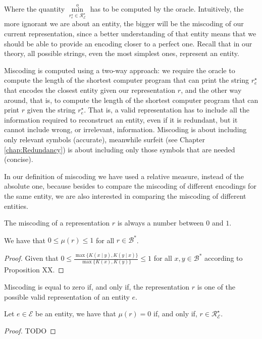 Where the quantity $\overset{o}{ \underset{ r^\star_e \in \mathcal{R}^\star_\mathcal{E} } \min}$ has to be computed by the oracle. Intuitively, the more ignorant we are about an entity, the bigger will be the miscoding of our current representation, since a better understanding of that entity means that we should be able to provide an encoding closer to a perfect one. Recall that in our theory, all possible strings, even the most simplest ones, represent an entity.

Miscoding is computed using a two-way approach: we require the oracle to compute the length of the shortest computer program that can print the string $r^\star_e$ that encodes the closest entity given our representation $r$, and the other way around, that is, to compute the length of the shortest computer program that can print $r$ given the string $r^\star_e$. That is, a valid representation has to include all the information required to reconstruct an entity, even if it is redundant, but it cannot include wrong, or irrelevant, information. Miscoding is about including only relevant symbols (accurate), meanwhile surfeit (see Chapter \ref{chap:Redundancy}) is about including only those symbols that are needed (concise).

In our definition of miscoding we have used a relative measure, instead of the absolute one, because besides to compare the miscoding of different encodings for the same entity, we are also interested in comparing the miscoding of different entities.

The miscoding of a representation $r$ is always a number between $0$ and $1$.

\begin{proposition}
\label{prop:range_miscoding}
We have that $0 \leq \mu(r) \leq 1$ for all $r \in \mathcal{B}^\ast$.
\end{proposition}
\begin{proof}
Given that $0 \leq \frac{ \max\{ K(x \mid y), K(y \mid x) \} } { \max\{ K(x), K(y) \} } \leq 1$ for all $x, y \in \mathcal{B}^\ast$ according to Proposition {\color{red} XX}.
\end{proof}

Miscoding is equal to zero if, and only if, the representation $r$ is one of the possible valid representation of an entity $e$.

\begin{proposition}\label{prop:perfect_encoding}
Let $e \in \mathcal{E}$ be an entity, we have that $\mu(r) = 0$ if, and only if, $r \in \mathcal{R}^\star_\mathcal{E}$.
\end{proposition}
\begin{proof}
{\color{red} TODO}
\end{proof}

